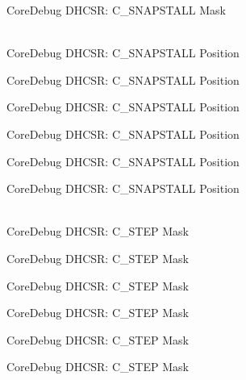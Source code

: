 \begin{DoxyRefList}
\label{deprecated__deprecated000585}%
%
Core\+Debug DHCSR:\+ C\+\_\+\+SNAPSTALL Mask  
\item[{\parbox[t]{\linewidth}{Global \doxylink{group__CMSIS__CoreDebug_ga85747214e2656df6b05ec72e4d22bd6d}{Core\+Debug\+\_\+\+DHCSR\+\_\+\+C\+\_\+\+SNAPSTALL\+\_\+\+Pos} }}]\hfill \\
\label{deprecated__deprecated000031}%
%
Core\+Debug DHCSR:\+ C\+\_\+\+SNAPSTALL Position 

\label{deprecated__deprecated000175}%
%
Core\+Debug DHCSR:\+ C\+\_\+\+SNAPSTALL Position 

\label{deprecated__deprecated000317}%
%
Core\+Debug DHCSR:\+ C\+\_\+\+SNAPSTALL Position 

\label{deprecated__deprecated000393}%
%
Core\+Debug DHCSR:\+ C\+\_\+\+SNAPSTALL Position 

\label{deprecated__deprecated000482}%
%
Core\+Debug DHCSR:\+ C\+\_\+\+SNAPSTALL Position 

\label{deprecated__deprecated000584}%
%
Core\+Debug DHCSR:\+ C\+\_\+\+SNAPSTALL Position  
\item[{\parbox[t]{\linewidth}{Global \doxylink{group__CMSIS__CoreDebug_gae6bda72fbd32cc5734ff3542170dc00d}{Core\+Debug\+\_\+\+DHCSR\+\_\+\+C\+\_\+\+STEP\+\_\+\+Msk} }}]\hfill \\
\label{deprecated__deprecated000036}%
%
Core\+Debug DHCSR:\+ C\+\_\+\+STEP Mask 

\label{deprecated__deprecated000124}%
%
Core\+Debug DHCSR:\+ C\+\_\+\+STEP Mask 

\label{deprecated__deprecated000180}%
%
Core\+Debug DHCSR:\+ C\+\_\+\+STEP Mask 

\label{deprecated__deprecated000263}%
%
Core\+Debug DHCSR:\+ C\+\_\+\+STEP Mask 

\label{deprecated__deprecated000322}%
%
Core\+Debug DHCSR:\+ C\+\_\+\+STEP Mask 

\label{deprecated__deprecated000398}%
%
Core\+Debug DHCSR:\+ C\+\_\+\+STEP Mask 


\end{DoxyRefList}
